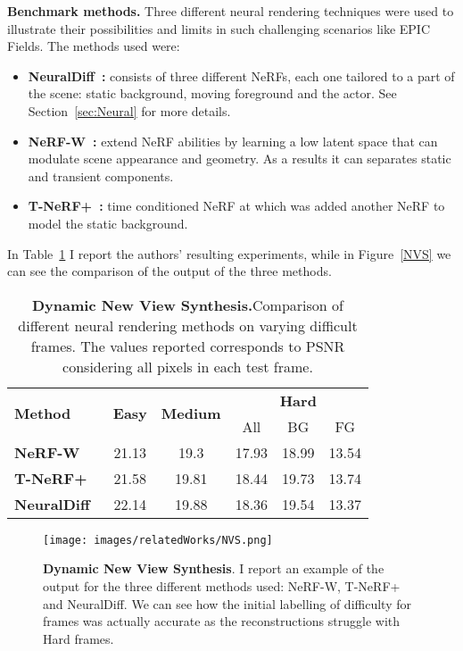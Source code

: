 \textbf{Benchmark methods.} Three different neural rendering techniques were used to illustrate their possibilities and limits in such challenging scenarios like
EPIC Fields. The methods used were:
\begin{itemize}
    \item \textbf{NeuralDiff~\cite{neuraldiff}:} consists of three different NeRFs, each one tailored to a part of the scene: static background, moving foreground and the actor. See 
        Section~\ref{sec:Neural} for more details.
    \item \textbf{NeRF-W~\cite{nerfw}:} extend NeRF abilities by learning a low latent space that can modulate scene appearance and geometry. As a results it can separates static and transient
            components.
    \item \textbf{T-NeRF+~\cite{Tnerf}:} time conditioned NeRF at which was added another NeRF to model the static background.
\end{itemize}

In Table~\ref{tab:NVS_comp} I report the authors' resulting experiments, while in Figure~\ref{NVS} we can see the comparison of the output of the three methods. 
\begin{table}
\centering
\begin{tabular}{lccccc}
    \hline \multirow{2}{*}{ \textbf{Method} } & \multirow{2}{*}{ \textbf{Easy} } & \multirow{2}{*}{ \textbf{Medium} } & \multicolumn{3}{c}{ \textbf{Hard} } \\
    \cline { 4 - 6 } & & & All & BG & FG \\
    \hline \textbf{NeRF-W}~\cite{nerfw} & 21.13 & 19.3 & 17.93 & 18.99 & 13.54 \\
    \textbf{T-NeRF+} ~\cite{Tnerf} & 21.58 & 19.81 & 18.44 & 19.73 & 13.74 \\
    \textbf{NeuralDiff}~\cite{neuraldiff} & 22.14 & 19.88 & 18.36 & 19.54 & 13.37 \\
    \hline
\end{tabular}
\caption{\textbf{Dynamic New View Synthesis.}Comparison of different neural rendering methods on varying difficult frames. The values
reported corresponds to PSNR considering all pixels in each test frame.} \label{tab:NVS_comp}
\end{table}


\begin{figure}
    \centering
    \texttt{[image: images/relatedWorks/NVS.png]} 
    \caption{\textbf{Dynamic New View Synthesis}. I report an example of the output for the three different methods used: NeRF-W, T-NeRF+ and 
    NeuralDiff. We can see how the initial labelling of difficulty for frames was actually accurate as the reconstructions
    struggle with Hard frames.}\label{fig:NVS}
\end{figure}


